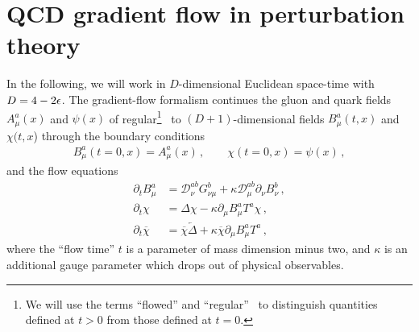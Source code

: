 \section{QCD gradient flow in perturbation theory}\label{sec:pert}

In the following, we will work in $D$-dimensional Euclidean space-time
with $D=4-2\epsilon$.  The gradient-flow formalism continues the gluon and
quark fields $A^a_\mu(x)$ and $\psi(x)$ of regular\footnote{We will use
  the terms ``flowed'' and ``regular'' \qcd\ to distinguish quantities
  defined at $t>0$ from those defined at $t=0$.} \qcd\ to
$(D+1)$-dimensional fields $B^a_\mu(t,x)$ and $\chi(t,x$) through the
boundary conditions
\begin{equation}
  \begin{split}
    B_\mu^a (t=0,x) = A_\mu^a (x)\,,\qquad \chi (t=0,x)= \psi(x)\,,
    \label{eq:bound}
  \end{split}
\end{equation}
and the flow equations
\begin{equation}
  \begin{split}
    \partial_t B_\mu^a &= \mathcal{D}^{ab}_\nu G_{\nu\mu}^b + \kappa
    \mathcal{D}^{ab}_\mu \partial_\nu B_\nu^b\,,\\ \partial_t \chi &= \Delta \chi
    - \kappa \partial_\mu B_\mu^a T^a \chi\,,\\ \partial_t \overline
    \chi &= \overline \chi \overleftarrow \Delta + \kappa \overline \chi
    \partial_\mu B_\mu^a T^a\,,
    \label{eq:flow}
  \end{split}
\end{equation}
where the ``flow time'' $t$ is a parameter of mass dimension minus two, and
$\kappa$ is an additional gauge parameter which drops out of physical
observables.

